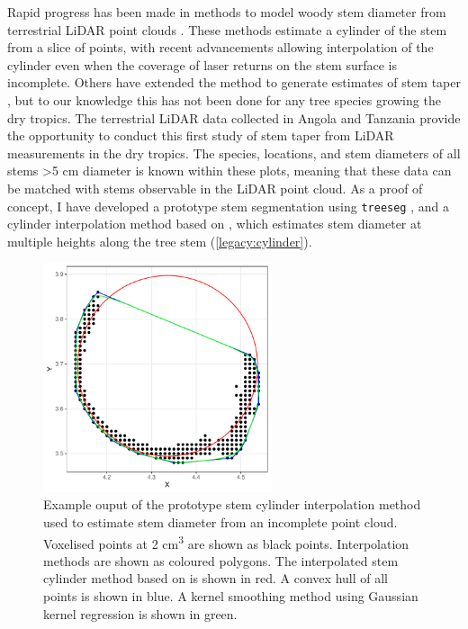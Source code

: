 \begin{refsection}
Rapid progress has been made in methods to model woody stem diameter from terrestrial LiDAR point clouds \citep{Bogdanovich2021, Hopkinson2004, Srinivasan2015, Ravaglia2019, Wang2016}. These methods estimate a cylinder of the stem from a slice of points, with recent advancements allowing interpolation of the cylinder even when the coverage of laser returns on the stem surface is incomplete. Others have extended the method to generate estimates of stem taper \citep{Henning2006, Thies2004}, but to our knowledge this has not been done for any tree species growing the dry tropics. The terrestrial LiDAR data collected in Angola and Tanzania provide the opportunity to conduct this first study of stem taper from LiDAR measurements in the dry tropics. The species, locations, and stem diameters of all stems >5 cm diameter is known within these plots, meaning that these data can be matched with stems observable in the LiDAR point cloud. As a proof of concept, I have developed a prototype stem segmentation using \texttt{treeseg} \citep{Burt2018}, and a cylinder interpolation method based on \citet{Umbach2003}, which estimates stem diameter at multiple heights along the tree stem (\autoref{legacy:cylinder}).

\begin{figure}[!h]
\centering
	\includegraphics[width=0.6\textwidth]{img/cylinder}
	\caption[Stem cross section cylinder interpolation to estimate stem diameter from terrestrial LiDAR]{Example ouput of the prototype stem cylinder interpolation method used to estimate stem diameter from an incomplete point cloud. Voxelised points at 2 cm\textsuperscript{3} are shown as black points. Interpolation methods are shown as coloured polygons. The interpolated stem cylinder method based on \citet{Umbach2003} is shown in red. A convex hull of all points is shown in blue. A kernel smoothing method using Gaussian kernel regression is shown in green.}
	\label{legacy:cylinder}
\end{figure}




\end{refsection}
